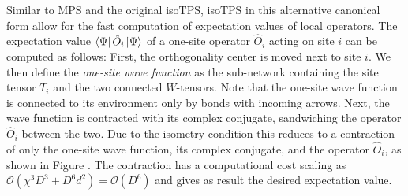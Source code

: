 Similar to MPS and the original isoTPS, isoTPS in this alternative canonical form allow for the fast computation of expectation values of local operators. The expectation value $\bra{\Psi}\hat{O}_i\ket{\Psi}$ of a one-site operator $\hat{O}_i$ acting on site $i$ can be computed as follows: First, the orthogonality center is moved next to site $i$. We then define the \textit{one-site wave function} as the sub-network containing the site tensor $T_i$ and the two connected $W$-tensors. Note that the one-site wave function is connected to its environment only by bonds with incoming arrows. Next, the wave function is contracted with its complex conjugate, sandwiching the operator $\hat{O}_i$ between the two. Due to the isometry condition this reduces to a contraction of only the one-site wave function, its complex conjugate, and the operator $\hat{O}_i$, as shown in Figure . The contraction has a computational cost scaling as $\mathcal{O}\left(\chi^3 D^3 + D^6d^2\right) = \mathcal{O}(D^6)$ and gives as result the desired expectation value. \par
